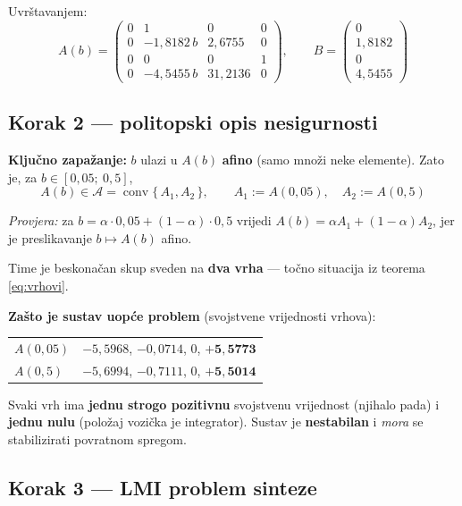 \begin{zadatak}
Uvrštavanjem:
\[
A(b) = \begin{pmatrix}
0 & 1 & 0 & 0 \\
0 & -1{,}8182\,b & 2{,}6755 & 0 \\
0 & 0 & 0 & 1 \\
0 & -4{,}5455\,b & 31{,}2136 & 0
\end{pmatrix},
\qquad
B = \begin{pmatrix}0\\ 1{,}8182\\ 0\\ 4{,}5455\end{pmatrix}
\]

\subsection*{Korak 2 --- politopski opis nesigurnosti}

\textbf{Ključno zapažanje:} $b$ ulazi u $A(b)$ \textbf{afino} (samo množi neke
elemente). Zato je, za $b \in [0{,}05;\ 0{,}5]$,
\[
A(b) \in \mathcal{A} = \operatorname{conv}\{\, A_1, A_2 \,\},
\qquad A_1 := A(0{,}05), \quad A_2 := A(0{,}5)
\]

\emph{Provjera:} za $b = \alpha\cdot0{,}05 + (1-\alpha)\cdot0{,}5$ vrijedi
$A(b) = \alpha A_1 + (1-\alpha)A_2$, jer je preslikavanje $b \mapsto A(b)$
afino. \checkmark

Time je beskonačan skup sveden na \textbf{dva vrha} --- točno situacija iz
teorema \eqref{eq:vrhovi}.

\textbf{Zašto je sustav uopće problem} (svojstvene vrijednosti vrhova):
\begin{center}
\begin{tabular}{ll}
\toprule
$A(0{,}05)$ & $-5{,}5968$, \; $-0{,}0714$, \; $0$, \; $\mathbf{+5{,}5773}$ \\
$A(0{,}5)$ & $-5{,}6994$, \; $-0{,}7111$, \; $0$, \; $\mathbf{+5{,}5014}$ \\
\bottomrule
\end{tabular}
\end{center}

Svaki vrh ima \textbf{jednu strogo pozitivnu} svojstvenu vrijednost (njihalo
pada) i \textbf{jednu nulu} (položaj vozička je integrator). Sustav je
\textbf{nestabilan} i \emph{mora} se stabilizirati povratnom spregom.

\subsection*{Korak 3 --- LMI problem sinteze}


\end{zadatak}

